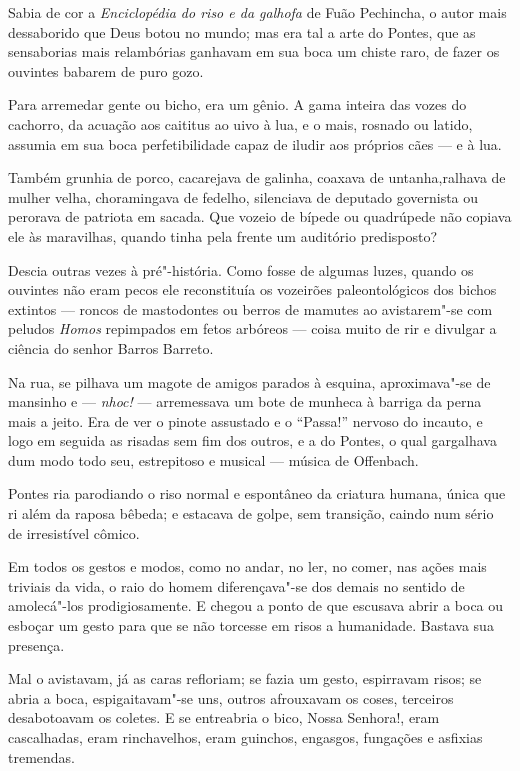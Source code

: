Sabia de cor a \emph{Enciclopédia do riso e da galhofa} de Fuão
Pechincha, o autor mais dessaborido que Deus botou no mundo; mas era tal
a arte do Pontes, que as sensaborias mais relambórias ganhavam em sua
boca um chiste raro, de fazer os ouvintes babarem de puro gozo.

Para arremedar gente ou bicho, era um gênio. A gama inteira das vozes do
cachorro, da acuação aos caititus ao uivo à lua, e o mais, rosnado ou
latido, assumia em sua boca perfetibilidade capaz de iludir aos próprios
cães --- e à lua.

Também grunhia de porco, cacarejava de galinha, coaxava de
untanha,ralhava de mulher velha, choramingava de fedelho, silenciava de
deputado governista ou perorava de patriota em sacada. Que vozeio de
bípede ou quadrúpede não copiava ele às maravilhas, quando tinha pela
frente um auditório predisposto?

Descia outras vezes à pré"-história. Como fosse de algumas luzes, quando
os ouvintes não eram pecos ele reconstituía os vozeirões paleontológicos
dos bichos extintos --- roncos de mastodontes ou berros de mamutes ao
avistarem"-se com peludos \emph{Homos} repimpados em fetos arbóreos ---
coisa muito de rir e divulgar a ciência do senhor Barros Barreto.

Na rua, se pilhava um magote de amigos parados à esquina, aproximava"-se
de mansinho e --- \emph{nhoc!} --- arremessava um bote de munheca à
barriga da perna mais a jeito. Era de ver o pinote assustado e o
``Passa!'' nervoso do incauto, e logo em seguida as risadas sem fim dos
outros, e a do Pontes, o qual gargalhava dum modo todo seu, estrepitoso
e musical --- música de Offenbach.

Pontes ria parodiando o riso normal e espontâneo da criatura humana,
única que ri além da raposa bêbeda; e estacava de golpe, sem transição,
caindo num sério de irresistível cômico.

Em todos os gestos e modos, como no andar, no ler, no comer, nas ações
mais triviais da vida, o raio do homem diferençava"-se dos demais no
sentido de amolecá"-los prodigiosamente. E chegou a ponto de que escusava
abrir a boca ou esboçar um gesto para que se não torcesse em risos a
humanidade. Bastava sua presença.

Mal o avistavam, já as caras refloriam; se fazia um gesto, espirravam
risos; se abria a boca, espigaitavam"-se uns, outros afrouxavam os coses,
terceiros desabotoavam os coletes. E se entreabria o bico, Nossa
Senhora!, eram cascalhadas, eram rinchavelhos, eram guinchos, engasgos,
fungações e asfixias tremendas.

